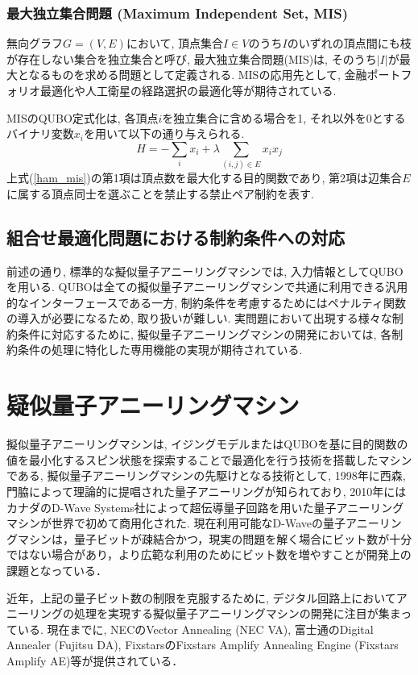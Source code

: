 \documentclass[submit,techrep,noauthor]{ipsj}
\begin{document}
\subsubsection{最大独立集合問題 (Maximum Independent Set, MIS)}
無向グラフ$G=(V, E)$において, 頂点集合$I\in V$のうち$I$のいずれの頂点間にも枝が存在しない集合を独立集合と呼び, 最大独立集合問題(MIS)は, そのうち$|I|$が最大となるものを求める問題として定義される. MISの応用先として, 金融ポートフォリオ最適化や人工衛星の経路選択の最適化等が期待されている.

MISのQUBO定式化は, 各頂点$i$を独立集合に含める場合を1, それ以外を0とするバイナリ変数$x_{i}$を用いて以下の通り与えられる.
\begin{equation}
H = -\sum_{i}x_{i} + \lambda\sum_{(i,j)\in E }x_{i}x_{j} \label{ham_mis}
\end{equation}
上式(\ref{ham_mis})の第1項は頂点数を最大化する目的関数であり, 第2項は辺集合$E$に属する頂点同士を選ぶことを禁止する禁止ペア制約を表す.

\subsection{組合せ最適化問題における制約条件への対応}
前述の通り, 標準的な擬似量子アニーリングマシンでは, 入力情報としてQUBOを用いる. QUBOは全ての擬似量子アニーリングマシンで共通に利用できる汎用的なインターフェースである一方, 制約条件を考慮するためにはペナルティ関数の導入が必要になるため, 取り扱いが難しい. 実問題において出現する様々な制約条件に対応するために, 擬似量子アニーリングマシンの開発においては, 各制約条件の処理に特化した専用機能の実現が期待されている.

\section{疑似量子アニーリングマシン}
擬似量子アニーリングマシンは, イジングモデルまたはQUBOを基に目的関数の値を最小化するスピン状態を探索することで最適化を行う技術を搭載したマシンである, 擬似量子アニーリングマシンの先駆けとなる技術として, 1998年に西森, 門脇によって理論的に提唱された量子アニーリング\cite{nishimori}が知られており, 2010年にはカナダのD-Wave Systems社によって超伝導量子回路を用いた量子アニーリングマシンが世界で初めて商用化された\cite{d-wave}. 現在利用可能なD-Waveの量子アニーリングマシンは，量子ビットが疎結合かつ，現実の問題を解く場合にビット数が十分ではない場合があり，より広範な利用のためにビット数を増やすことが開発上の課題となっている．

近年，上記の量子ビット数の制限を克服するために, デジタル回路上においてアニーリングの処理を実現する擬似量子アニーリングマシンの開発に注目が集まっている. 現在までに, NECのVector Annealing (NEC VA)\cite{va}, 富士通のDigital Annealer (Fujitsu DA)\cite{da}, FixstarsのFixstars Amplify Annealing Engine (Fixstars Amplify AE)\cite{amplify}等が提供されている．
\end{document}
